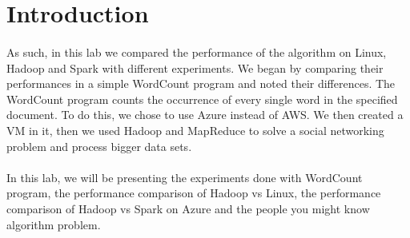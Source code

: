 \documentclass[12pt]{article}
\begin{document}
\section{Introduction} \label{sec:introduction}
	\paragraph{} As such, in this lab we compared the performance of the algorithm on Linux, Hadoop and Spark with 
	different experiments. We began by comparing  their performances in a simple WordCount program and noted their 
	differences. The WordCount program counts the occurrence of every single word in the specified document. 
	To do this, we chose to use Azure instead of AWS. We then created a VM in it, then we used Hadoop and MapReduce 
	to solve a social networking problem and process bigger data sets.
	\bigskip

	\paragraph{} In this lab, we will be presenting the experiments done with WordCount program, the performance 
	comparison of Hadoop vs Linux, the performance comparison of Hadoop vs Spark on Azure and the people you might
	know algorithm problem. 

	\bigskip

	\noindent 
	\bigskip

	\pagebreak
\end{document}
